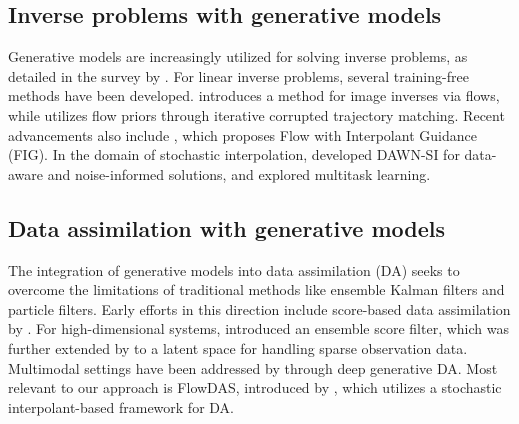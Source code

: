 \subsection{Inverse problems with generative models}
Generative models are increasingly utilized for solving inverse problems, as detailed in the survey by \cite{daras_survey_2024}. For linear inverse problems, several training-free methods have been developed.  \cite{pokle_training-free_2024} introduces a method for image inverses via flows, while \cite{zhang_flow_2025} utilizes flow priors through iterative corrupted trajectory matching.  Recent advancements also include \cite{yan_fig_2024}, which proposes Flow with Interpolant Guidance (FIG).  In the domain of stochastic interpolation, \cite{ahamed_dawn-si_2024} developed DAWN-SI for data-aware and noise-informed solutions, and \cite{negrel_multitask_2025} explored multitask learning.

\subsection{Data assimilation with generative models}

The integration of generative models into data assimilation (DA) seeks to overcome the limitations of traditional methods like ensemble Kalman filters and particle filters.  Early efforts in this direction include score-based data assimilation by \cite{rozet_score-based_2023}.  For high-dimensional systems, \cite{bao_ensemble_2024} introduced an ensemble score filter, which was further extended by \cite{si_latent-ensf_2024} to a latent space for handling sparse observation data.  Multimodal settings have been addressed by \cite{qu_deep_2024} through deep generative DA. Most relevant to our approach is FlowDAS, introduced by \cite{chen_flowdas_2025}, which utilizes a stochastic interpolant-based framework for DA.

